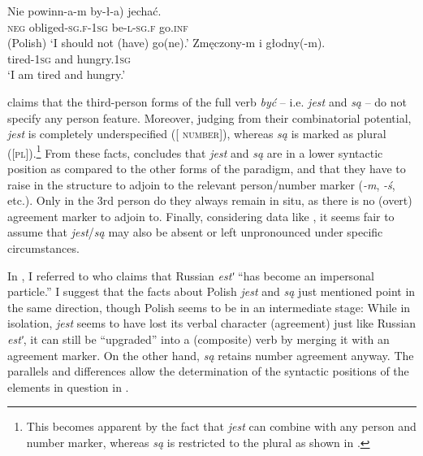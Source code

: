\documentclass[output=paper]{langscibook}
\begin{document}
\ea
\ea\gll Nie powinn-a-m \minsp{(} by-ł-a) jechać.\\
\textsc{neg} obliged\textsc{-sg.f-1sg} {} be\textsc{-l-sg.f} go.\textsc{inf}\\ \hfill (Polish)
\glt `I should not (have) go(ne).' \label{pitsch:ex:Polish_powinien}
\ex\gll Zmęczony-m i głodny(-m).\\
tired-\textsc{1sg} and hungry.\textsc{1sg}\\ 
\glt `I am tired and hungry.' \hfill \citep[234]{Migdalski2006} \label{pitsch:ex:Polish_ShortCopula}
\z\z

\noindent \citet[275--276]{Migdalski2006} claims that the third-person forms of the full verb \textit{być} -- i.e. \textit{jest} and \textit{są} -- do not specify any person feature. Moreover, judging from their combinatorial potential, \textit{jest} is completely underspecified ([\textalpha\! \textsc{number}]), whereas \textit{są} is marked as plural ([\textsc{pl}]).\footnote{This becomes apparent by the fact that \textit{jest} can combine with any person and number marker, whereas \textit{są} is restricted to the plural as shown in .} From these facts, \citet[275]{Migdalski2006} concludes that \textit{jest} and \textit{są} are in a lower syntactic position as compared to the other forms of the paradigm, and that they have to raise in the structure to adjoin to the relevant person/number marker (\textit{-m}, \textit{-ś}, etc.). Only in the 3rd person do they always remain in situ, as there is no (overt) agreement marker to adjoin to. Finally, considering data like , it seems fair to assume that \textit{jest}/\textit{są} may also be absent or left unpronounced under specific circumstances.

In , I referred to \citet[192]{Issatchenko1940} who claims that Russian \textit{estʹ} ``has become an impersonal particle.'' I suggest that the facts about Polish \textit{jest} and \textit{są} just mentioned point in the same direction, though Polish seems to be in an intermediate stage: While in isolation, \textit{jest} seems to have lost its verbal character (agreement) just like Russian \textit{estʹ}, it can still be ``upgraded'' into a (composite) verb by merging it with an agreement marker. On the other hand, \textit{są} retains number agreement anyway. The parallels and differences allow the determination of the syntactic positions of the elements in question in .
\end{document}
